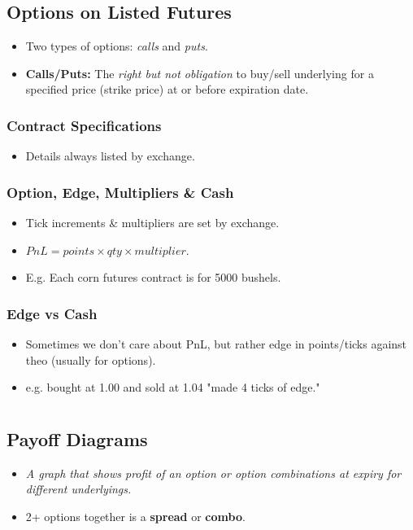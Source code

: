 \documentclass{article}
\begin{document}
\subsection*{Options on Listed Futures}
\begin{itemize}
    \item Two types of options: \textit{calls} and \textit{puts}.
    \item \textbf{Calls/Puts:} The \textit{right but not obligation} to buy/sell
     underlying for a specified price (strike price) at or before expiration date.
\end{itemize}

\subsubsection{Contract Specifications}
\begin{itemize}
    \item Details always listed by exchange.
\end{itemize}

\subsubsection{Option, Edge, Multipliers \& Cash}
\begin{itemize}
    \item Tick increments \& multipliers are set by exchange.
    \item $PnL = points \times qty \times multiplier$.
    \item E.g. Each corn futures contract is for 5000 bushels.
\end{itemize}

\subsubsection{Edge vs Cash}
\begin{itemize}
    \item Sometimes we don't care about PnL, but rather edge in points/ticks
    against theo (usually for options).
    \item e.g. bought at 1.00 and sold at 1.04 "made 4 ticks of edge."
\end{itemize}

\section{}
\subsection{Payoff Diagrams}
\begin{itemize}
    \item \textit{A graph that shows profit of an option or option combinations at expiry
for different underlyings.}
\item 2+ options together is a \textbf{spread} or \textbf{combo}.
\end{itemize}
\end{document}
